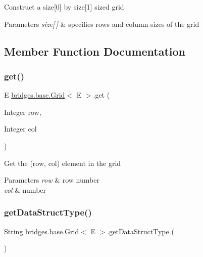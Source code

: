 Construct a size\mbox{[}0\mbox{]} by size\mbox{[}1\mbox{]} sized grid 
\begin{DoxyParams}{Parameters}
{\em size\mbox{[}$\,$\mbox{]}} & specifies rows and column sizes of the grid \\
\hline
\end{DoxyParams}


\subsection{Member Function Documentation}
\mbox{\label{classbridges_1_1base_1_1_grid_a698579bb5b7166f76a18a1b04916e090}} 
\subsubsection{\texorpdfstring{get()}{get()}}
{\footnotesize\ttfamily E \hyperlink{classbridges_1_1base_1_1_grid}{bridges.\+base.\+Grid}$<$ E $>$.get (\begin{DoxyParamCaption}\item[{Integer}]{row,  }\item[{Integer}]{col }\end{DoxyParamCaption})}

Get the (row, col) element in the grid 
\begin{DoxyParams}{Parameters}
{\em row} & row number \\
\hline
{\em col} & number \\
\hline
\end{DoxyParams}
\mbox{\label{classbridges_1_1base_1_1_grid_a81f268dd27c292ff2af9358039d4ebe6}} 
\subsubsection{\texorpdfstring{get\+Data\+Struct\+Type()}{getDataStructType()}}
{\footnotesize\ttfamily String \hyperlink{classbridges_1_1base_1_1_grid}{bridges.\+base.\+Grid}$<$ E $>$.get\+Data\+Struct\+Type (\begin{DoxyParamCaption}{ }\end{DoxyParamCaption})}

